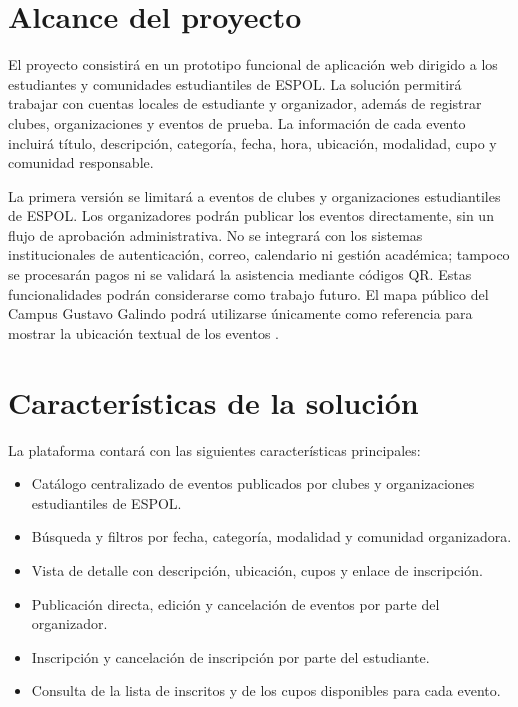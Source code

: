 \documentclass[12pt]{article}
\begin{document}
\section{Alcance del proyecto}

El proyecto consistirá en un prototipo funcional de aplicación web dirigido a los estudiantes y comunidades estudiantiles de ESPOL. La solución permitirá trabajar con cuentas locales de estudiante y organizador, además de registrar clubes, organizaciones y eventos de prueba. La información de cada evento incluirá título, descripción, categoría, fecha, hora, ubicación, modalidad, cupo y comunidad responsable.

La primera versión se limitará a eventos de clubes y organizaciones estudiantiles de ESPOL. Los organizadores podrán publicar los eventos directamente, sin un flujo de aprobación administrativa. No se integrará con los sistemas institucionales de autenticación, correo, calendario ni gestión académica; tampoco se procesarán pagos ni se validará la asistencia mediante códigos QR. Estas funcionalidades podrán considerarse como trabajo futuro. El mapa público del Campus Gustavo Galindo podrá utilizarse únicamente como referencia para mostrar la ubicación textual de los eventos \cite{mapacampus}.

\section{Características de la solución}

La plataforma contará con las siguientes características principales:

\begin{itemize}
    \item Catálogo centralizado de eventos publicados por clubes y organizaciones estudiantiles de ESPOL.
    \item Búsqueda y filtros por fecha, categoría, modalidad y comunidad organizadora.
    \item Vista de detalle con descripción, ubicación, cupos y enlace de inscripción.
    \item Publicación directa, edición y cancelación de eventos por parte del organizador.
    \item Inscripción y cancelación de inscripción por parte del estudiante.
    \item Consulta de la lista de inscritos y de los cupos disponibles para cada evento.
\end{itemize}
\end{document}
